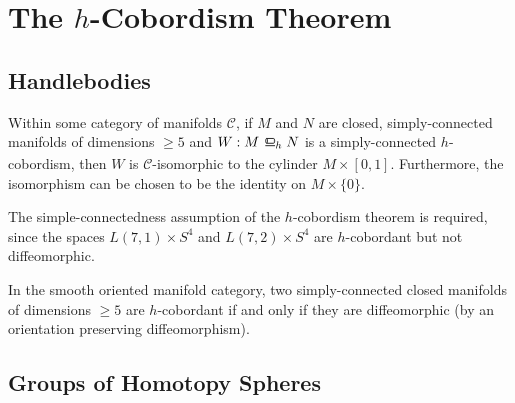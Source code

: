 \chapter{The \texorpdfstring{$h$}{h}-Cobordism Theorem}\label{chap:h-cobordism}


\section{Handlebodies}

\begin{theorem}[$h$-cobordism]
	Within some category of manifolds $\mathscr{C}$, if $M$ and $N$ are closed, simply-connected manifolds of dimensions $\geq 5$ and $W : M \hbord N$ is a simply-connected $h$-cobordism, then $W$ is $\mathscr{C}$-isomorphic to the cylinder $M\times [0,1]$. Furthermore, the isomorphism can be chosen to be the identity on $M\times \{0\}$.
\end{theorem}

\begin{example}
  The simple-connectedness assumption of the $h$-cobordism theorem is required, since the spaces $L(7,1)\times S^4$ and $L(7,2)\times S^4$ are $h$-cobordant but not diffeomorphic.
\end{example}

\begin{corollary}\label{thm:h-cobordism-diffeomorphism}
	In the smooth oriented manifold category, two simply-connected closed manifolds of dimensions $\geq 5$ are $h$-cobordant if and only if they are diffeomorphic (by an orientation preserving diffeomorphism).
\end{corollary}

\section{Groups of Homotopy Spheres}
